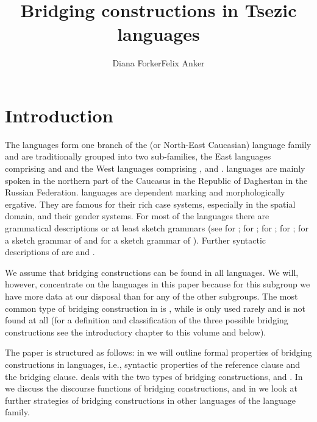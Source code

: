 \documentclass[output=paper]{LSP/langsci}
\author{Diana Forker\affiliation{University of Jena}\lastand Felix Anker\affiliation{University of Bamberg}}
\title{Bridging constructions in Tsezic languages}
\begin{document}
\label{ch:4}

\section{Introduction} 
\label{sec:Introduction}
The  languages form one branch of the  (or North-East Caucasian) language family and are traditionally grouped into two sub-families, the East  languages comprising  and  and the West  languages comprising ,  and .  languages are mainly spoken in the northern part of the Caucasus in the Republic of Daghestan in the Russian Federation.  languages are dependent marking and morphologically ergative. They are famous for their rich case systems, especially in the spatial domain, and their gender systems. For most of the  languages there are grammatical descriptions or at least sketch grammars (see \citealt{Forker.2013a} for ; \citealt{Khalilova.2009} for ; \citealt{vandenBerg.1995} for ;  \citealt{Comrie.et.al.2015} for ; \citealt{Kibrik.Testelets.2004} for a sketch grammar of  and \citealt{Alekseev.Radzhabov.2004} for a sketch grammar of ). Further syntactic descriptions of  are \citet{Radjabov.1999} and \citet{Polinsky.InPreparation}.

We assume that bridging constructions can be found in all  languages. We will, however, concentrate on the  languages in this paper because for this subgroup we have more data at our disposal than for any of the other subgroups. The most common type of bridging construction in  is , while  is only used rarely and  is not found at all (for a definition and classification of the three possible bridging constructions see the introductory chapter to this volume and  below).

The paper is structured as follows: in  we will outline formal properties of bridging constructions in  languages, i.e., syntactic properties of the reference clause and the bridging clause.  deals with the two types of bridging constructions,  and . In  we discuss the discourse functions of bridging constructions, and in  we look at further strategies of bridging constructions in other languages of the  language family. 
\end{document}

